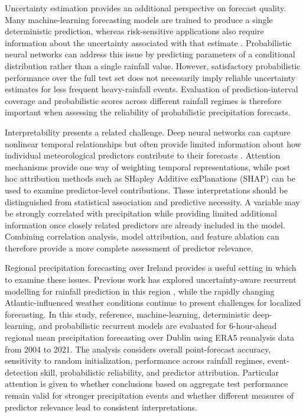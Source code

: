 \documentclass[referee,pdflatex,sn-basic]{sn-jnl}%
\theoremstyle{thmstyleone}%
\theoremstyle{thmstyletwo}%
\theoremstyle{thmstylethree}%
\begin{document}
Uncertainty estimation provides an additional perspective on forecast quality. Many machine-learning forecasting models are trained to produce a single deterministic prediction, whereas risk-sensitive applications also require information about the uncertainty associated with that estimate \citep{yang2024interpretable}. Probabilistic neural networks can address this issue by predicting parameters of a conditional distribution rather than a single rainfall value. However, satisfactory probabilistic performance over the full test set does not necessarily imply reliable uncertainty estimates for less frequent heavy-rainfall events. Evaluation of prediction-interval coverage and probabilistic scores across different rainfall regimes is therefore important when assessing the reliability of probabilistic precipitation forecasts.

Interpretability presents a related challenge. Deep neural networks can capture nonlinear temporal relationships but often provide limited information about how individual meteorological predictors contribute to their forecasts \citep{du2019techniques}. Attention mechanisms provide one way of weighting temporal representations, while post hoc attribution methods such as SHapley Additive exPlanations (SHAP) \citep{lundberg2017unified} can be used to examine predictor-level contributions. These interpretations should be distinguished from statistical association and predictive necessity. A variable may be strongly correlated with precipitation while providing limited additional information once closely related predictors are already included in the model. Combining correlation analysis, model attribution, and feature ablation can therefore provide a more complete assessment of predictor relevance.

Regional precipitation forecasting over Ireland provides a useful setting in which to examine these issues. Previous work has explored uncertainty-aware recurrent modelling for rainfall prediction in this region \citep{10906190}, while the rapidly changing Atlantic-influenced weather conditions continue to present challenges for localized forecasting. In this study, reference, machine-learning, deterministic deep-learning, and probabilistic recurrent models are evaluated for 6-hour-ahead regional mean precipitation forecasting over Dublin using ERA5 reanalysis data from 2004 to 2021. The analysis considers overall point-forecast accuracy, sensitivity to random initialization, performance across rainfall regimes, event-detection skill, probabilistic reliability, and predictor attribution. Particular attention is given to whether conclusions based on aggregate test performance remain valid for stronger precipitation events and whether different measures of predictor relevance lead to consistent interpretations.
\end{document}
